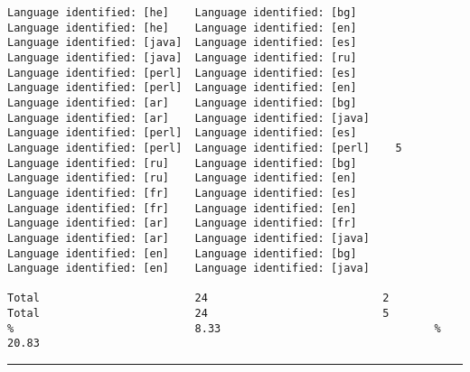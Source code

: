 \begin{verbatim}
Language identified: [he]    Language identified: [bg]            Language identified: [he]    Language identified: [en]
Language identified: [java]  Language identified: [es]            Language identified: [java]  Language identified: [ru]
Language identified: [perl]  Language identified: [es]            Language identified: [perl]  Language identified: [en]
Language identified: [ar]    Language identified: [bg]            Language identified: [ar]    Language identified: [java]
Language identified: [perl]  Language identified: [es]            Language identified: [perl]  Language identified: [perl]    5
Language identified: [ru]    Language identified: [bg]            Language identified: [ru]    Language identified: [en]
Language identified: [fr]    Language identified: [es]            Language identified: [fr]    Language identified: [en]
Language identified: [ar]    Language identified: [fr]            Language identified: [ar]    Language identified: [java]
Language identified: [en]    Language identified: [bg]            Language identified: [en]    Language identified: [java]

Total                        24                           2       Total                        24                           5
%                            8.33                                 %                            20.83
\end{verbatim}
\vskip4pt\hrule

